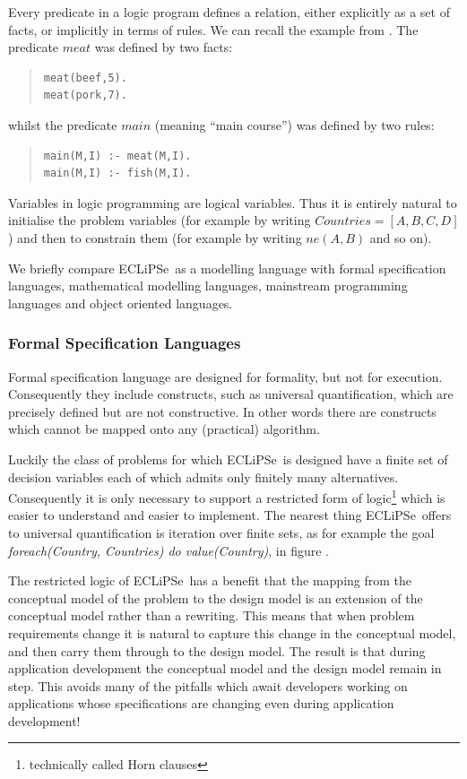 \documentclass[a4wide]{article}
\newcommand{\ECL}{\mbox{ECLiPSe\ }{\hspace{1mm}}}
\begin{document}
Every predicate in a logic program defines a relation, either
explicitly as a set of facts, or implicitly in terms of rules.
We can recall the example from \cite{consprog}.
The predicate $meat$ was defined by two facts:
\begin{quote}
\begin{verbatim}
meat(beef,5).
meat(pork,7).
\end{verbatim}
\end{quote}
whilst the predicate $main$ (meaning ``main course'') was defined by
two rules:
\begin{quote}
\begin{verbatim}
main(M,I) :- meat(M,I).
main(M,I) :- fish(M,I).
\end{verbatim}
\end{quote}

Variables in logic programming are logical variables.  Thus it is
entirely natural to initialise the problem variables (for example by
writing $Countries = [A,B,C,D]$) and then to constrain them (for
example by writing $ne(A,B)$ and so on).

We briefly compare \ECL as a modelling language with formal
specification languages, mathematical modelling languages,
mainstream programming languages and object oriented languages.

\subsubsection{Formal Specification Languages}
Formal specification language are designed for formality, but not for
execution.  Consequently they include constructs, such as universal
quantification, which are precisely defined but are not constructive.
In other words there are constructs which cannot be mapped onto any
(practical) algorithm. 

Luckily the class of problems for which \ECL is designed have a finite
set of decision variables each of which admits only finitely many
alternatives.  Consequently it is only necessary to support a
restricted form of logic\footnote{technically called Horn clauses}
which is easier to understand and easier to implement.
The nearest thing \ECL offers to universal quantification is iteration
over finite sets, as for example the goal
{\em foreach(Country, Countries) do value(Country)},
in figure \pageref{mapconceptual}.

The restricted logic of \ECL has a benefit that the mapping from the
conceptual model of the problem to the design model is an extension of
the conceptual model rather than a rewriting.
This means that when problem requirements change it is natural to
capture this change in the conceptual model, and then carry them
through to the design model.
The result is that during application development the conceptual model
and the design model remain in step.
This avoids many of the pitfalls which await developers working on
applications whose specifications are changing even during application
development!
\end{document}
